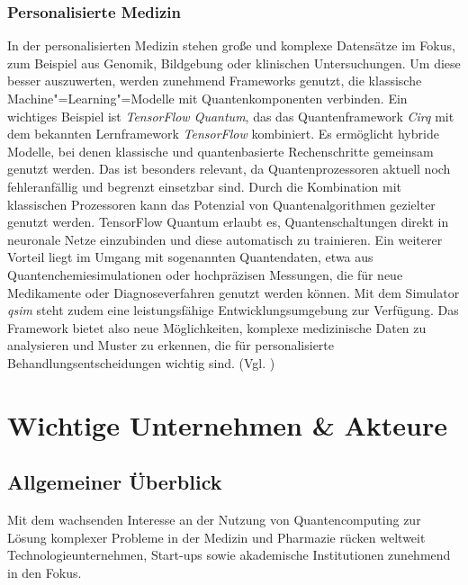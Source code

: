 \subsubsection*{Personalisierte Medizin}
In der personalisierten Medizin stehen große und komplexe Datensätze im Fokus, zum Beispiel aus Genomik, Bildgebung oder klinischen Untersuchungen. Um diese besser auszuwerten, werden zunehmend Frameworks genutzt, die klassische Machine"=Learning"=Modelle mit Quantenkomponenten verbinden. Ein wichtiges Beispiel ist \textit{TensorFlow Quantum}, das das Quantenframework \textit{Cirq} mit dem bekannten Lernframework \textit{TensorFlow} kombiniert. Es ermöglicht hybride Modelle, bei denen klassische und quantenbasierte Rechenschritte gemeinsam genutzt werden. Das ist besonders relevant, da Quantenprozessoren aktuell noch fehleranfällig und begrenzt einsetzbar sind. Durch die Kombination mit klassischen Prozessoren kann das Potenzial von Quantenalgorithmen gezielter genutzt werden. TensorFlow Quantum erlaubt es, Quantenschaltungen direkt in neuronale Netze einzubinden und diese automatisch zu trainieren. Ein weiterer Vorteil liegt im Umgang mit sogenannten Quantendaten, etwa aus Quantenchemiesimulationen oder hochpräzisen Messungen, die für neue Medikamente oder Diagnoseverfahren genutzt werden können. Mit dem Simulator \textit{qsim} steht zudem eine leistungsfähige Entwicklungsumgebung zur Verfügung. Das Framework bietet also neue Möglichkeiten, komplexe medizinische Daten zu analysieren und Muster zu erkennen, die für personalisierte Behandlungsentscheidungen wichtig sind. (Vgl. \cite{broughton_tensorflow_2021})

\section{Wichtige Unternehmen \& Akteure}

\subsection{Allgemeiner Überblick}
Mit dem wachsenden Interesse an der Nutzung von Quantencomputing zur Lösung komplexer Probleme in der Medizin und Pharmazie rücken weltweit Technologieunternehmen, Start-ups sowie akademische Institutionen zunehmend in den Fokus.\\

